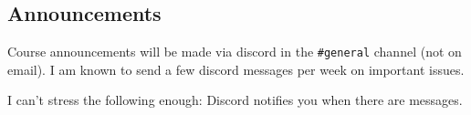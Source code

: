 
\subsection*{Announcements}

Course announcements will be made via discord in the \texttt{\#general} channel (not on email). I am known to send a few discord messages per week on important issues. %

I can't stress the following enough: Discord notifies you when there are messages. %